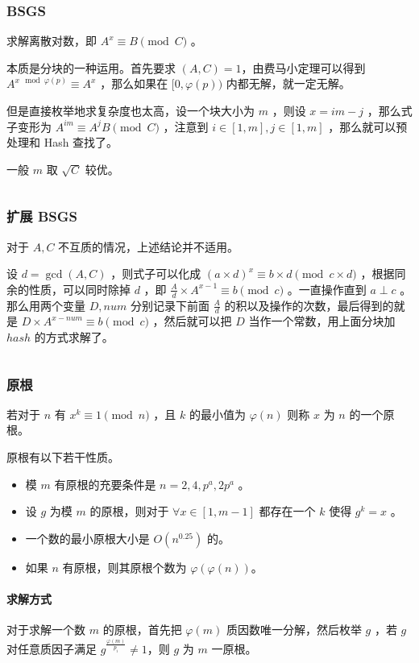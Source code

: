 \documentclass[UTF-8]{ctexart}
\newcommand{\cpp}[1]{\inputminted[bgcolor=bg,breaklines,breakanywhere=true]{c++}{#1}}
\begin{document}
			\subsubsection{BSGS}
			求解离散对数，即 $A^x \equiv B \pmod C$ 。
	
			本质是分块的一种运用。首先要求 $(A,C)=1$，由费马小定理可以得到 $A ^ {x \mod \varphi(p)} \equiv A ^ x$ ，那么如果在 $[0,\varphi(p))$ 内都无解，就一定无解。
	
			但是直接枚举地求复杂度也太高，设一个块大小为 $m$ ，则设 $x=im-j$ ，那么式子变形为 $A^{im} \equiv A^jB \pmod C$ ，注意到 $i \in [1,m],j \in [1,m]$ ，那么就可以预处理和 Hash 查找了。
	
			一般 $m$ 取 $\sqrt{C}$ 较优。
			\cpp{code//Math//bsgs.cpp}
			\subsubsection{扩展 BSGS}
			对于 $A,C$ 不互质的情况，上述结论并不适用。
	
			设 $d=\gcd(A,C)$ ，则式子可以化成 $(a \times d)^x \equiv b \times d \pmod {c \times d}$ ，根据同余的性质，可以同时除掉 $d$ ，即 $\frac{A}{d} \times A^{x-1} \equiv b \pmod c$ 。一直操作直到 $a \perp c$ 。那么用两个变量 $D,num$ 分别记录下前面 $\frac{A}{d}$ 的积以及操作的次数，最后得到的就是 $D \times A^{x-num} \equiv b \pmod c$ ，然后就可以把 $D$ 当作一个常数，用上面分块加 $hash$ 的方式求解了。
			
			\cpp{code//Math//exbsgs.cpp}
			\subsubsection{原根}
			若对于 $n$ 有 $x ^ k \equiv 1 \pmod n$ ，且 $k$ 的最小值为 $\varphi(n)$ 则称 $x$ 为 $n$ 的一个原根。
			
			原根有以下若干性质。
			\begin{itemize}
				\item 模 $m$ 有原根的充要条件是 $n=2,4,p^a,2p^a$ 。
				\item 设 $g$ 为模 $m$ 的原根，则对于 $\forall x \in [1,m-1]$ 都存在一个 $k$ 使得 $g^k=x$ 。
				\item 一个数的最小原根大小是 $O(n^{0.25})$ 的。
				\item 如果 $n$ 有原根，则其原根个数为 $\varphi(\varphi(n))$。
			\end{itemize}
			\paragraph{求解方式} 对于求解一个数 $m$ 的原根，首先把 $\varphi(m)$ 质因数唯一分解，然后枚举 $g$ ，若 $g$ 对任意质因子满足 $g^{\frac{\varphi(m)}{p_i}} \ne 1$，则 $g$ 为 $m$ 一原根。
			
\end{document}
